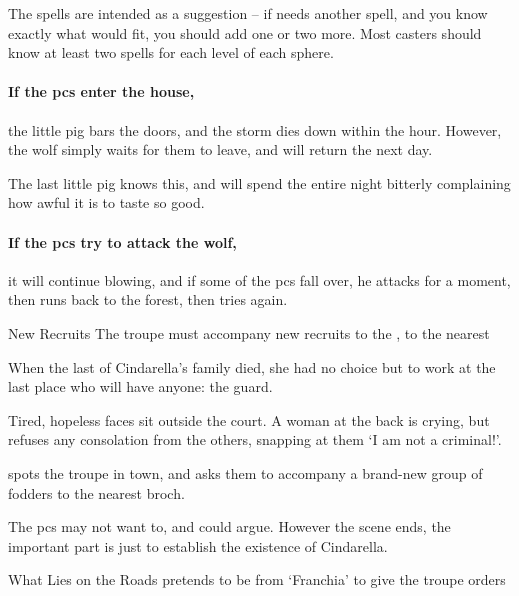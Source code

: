 \begin{multicols}{2}
The spells are intended as a suggestion -- if  needs another spell, and you know exactly what would fit, you should add one or two more.
Most casters should know at least two spells for each level of each \gls{sphere}.

\showStdSpells

\paragraph{If the \glspl{pc} enter the house,}
the little pig bars the doors, and the storm dies down within the hour.
However, the wolf simply waits for them to leave, and will return the next day.

The last little pig knows this, and will spend the entire night bitterly complaining how awful it is to taste so good.

\paragraph{If the \glspl{pc} try to attack the wolf,}
it will continue blowing, and if some of the \glspl{pc} fall over, he attacks for a moment, then runs back to the forest, then tries again.


{New Recruits}%
{The troupe must accompany new recruits to the , to the nearest }%

\begin{exampletext}
  When the last of Cindarella's family died, she had no choice but to work at the last place who will have anyone: the \gls{guard}.
\end{exampletext}

\begin{boxtext}
  Tired, hopeless faces sit outside the \gls{court}.
  A woman at the back is crying, but refuses any consolation from the others, snapping at them `I am not a criminal!'.
\end{boxtext}

 spots the troupe in town, and asks them to accompany a brand-new group of \glspl{fodder} to the nearest \gls{broch}.

The \glspl{pc} may not want to, and could argue.
However the scene ends, the important part is just to establish the existence of Cindarella.

{What Lies on the Roads}%
{ pretends to be  from `Franchia' to give the troupe orders}%


\end{multicols}
